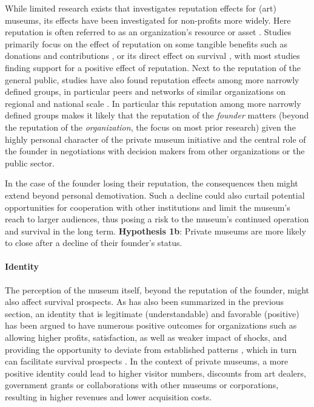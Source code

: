 \documentclass[12pt]{article}
\begin{document}
While limited research exists that investigates reputation effects for (art) museums, its effects have been investigated for non-profits more widely.
Here reputation is often referred to as an organization's resource or asset \parencite{Kong_Farrell_2010_image,Walker_McCarthy_2010_survival,Schloderer_Sarstedt_Ringle_2014_reputation}. 
Studies primarily focus on the effect of reputation on some tangible benefits such as donations and contributions \parencite{Sarstedt_2010_reputation,Mews_Boenigk_2012_blood,Heller_2008_alliances,Meijer_2009_reputation}, or its direct effect on survival \parencite{Lu_Shon_Zhang_2019_dissolution,Singh_1991_change,Hager_2001_vulnerability,Bielefeld_1994_survival,HernandezOrtiz_2022_discontinuity}, with most studies finding support for a positive effect of reputation.
Next to the reputation of the general public, studies have also found reputation effects among more narrowly defined groups, in particular peers \parencite{Padanyi_Gainer_2003_peerreputation} and networks of similar organizations on regional and national scale \parencite{Walker_McCarthy_2010_survival}.
In particular this reputation among more narrowly defined groups makes it likely that the reputation of the \emph{founder} matters (beyond the reputation of the \emph{organization}, the focus on most prior research) given the highly personal character of the private museum initiative and the central role of the founder in negotiations with decision makers from other organizations or the public sector.


In the case of the founder losing their reputation, the consequences then might extend beyond personal demotivation.
Such a decline could also curtail potential opportunities for cooperation with other institutions and limit the museum's reach to larger audiences, thus posing a risk to the museum's continued operation and survival in the long term.
\bigbreak
\noindent
\textbf{Hypothesis 1b}: Private museums are more likely to close after a decline of their founder's status.




\paragraph*{Identity}

The perception of the museum itself, beyond the reputation of the founder, might also affect survival prospects.
As has also been summarized in the previous section, an identity that is legitimate (understandable) and favorable (positive) has been argued to have numerous positive outcomes for organizations such as allowing higher profits, satisfaction, as well as weaker impact of shocks, and providing the opportunity to deviate from established patterns \parencite{Lange_Lee_Dai_2010_reputation}, which in turn can facilitate survival prospects \parencite{Rao_1994_reputation}.
In the context of private museums, a more positive identity could lead to higher visitor numbers, discounts from art dealers, government grants or collaborations with other museums or corporations, resulting in higher revenues and lower acquisition costs.
\end{document}

